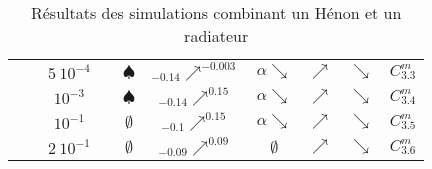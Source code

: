 \begin{table}[htbp]
\begin{tabular}{|c|c|c|c|c|c|c|c|c|c|}
					& & $5\ 10^{-4}$ & \accretionlot{} & $\spadesuit$ & ${}_{-0.14}\nearrow^{-0.003}$ & $\alpha\searrow$ & $\nearrow$ & $\searrow$ & $C_{3.3}^m$  \tabularnewline \cline{3-10}
					& & $10^{-3}$ & \accretionlot{} & $\spadesuit$ & ${}_{-0.14}\nearrow^{0.15}$ & $\alpha\searrow$ & $\nearrow$ & $\searrow$ & $C_{3.4}^m$  \tabularnewline \cline{3-10}
					& & $10^{-1}$ & \accretionlot{} & $\emptyset$ & ${}_{-0.1}\nearrow^{0.15}$ & $\alpha\searrow$ & $\nearrow$ & $\searrow$ & $C_{3.5}^m$  \tabularnewline \cline{3-10}
					& & $2\ 10^{-1}$ & \accretionlot{} & $\emptyset$ & ${}_{-0.09}\nearrow^{0.09}$ & $\emptyset$ & $\nearrow$ & $\searrow$ & $C_{3.6}^m$  \tabularnewline \cline{2-10}
			\hline
		\end{tabular}
	\caption{Résultats des simulations combinant un Hénon et un radiateur\label{Tab::SimuZoomRes}}
\end{table}

